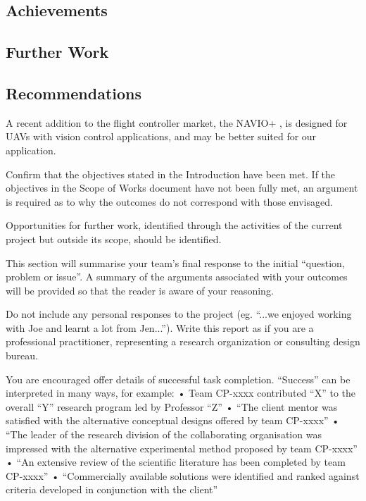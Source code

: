 \subsection{Achievements}


\subsection{Further Work}


\subsection{Recommendations}


 A recent addition to the flight controller market, the NAVIO+ \cite{ref:navio}, is designed for UAVs with vision control applications, and may be better suited for our application.

\color{red}
Confirm that the objectives stated in the Introduction have been met. If the objectives in the Scope of Works document have not been fully met, an argument is required as to why the outcomes do not correspond with those envisaged.

Opportunities for further work, identified through the activities of the current project but outside its scope, should be identified.

This section will summarise your team’s final response to the initial “question, problem or issue”.  A summary of the arguments associated with your outcomes will be provided so that the reader is aware of your reasoning.

Do not include any personal responses to the project (eg. “...we enjoyed working with Joe and learnt a lot from Jen...”).  Write this report as if you are a professional practitioner, representing a research organization or consulting design bureau.

You are encouraged offer details of successful task completion. “Success” can be interpreted in many ways, for example: 
•	Team CP-xxxx contributed “X” to the overall “Y” research program led by Professor “Z”
•	“The client mentor was satisfied with the alternative conceptual designs offered by team CP-xxxx”
•	“The leader of the research division of the collaborating organisation was impressed with the alternative experimental method proposed by team CP-xxxx”
•	“An extensive review of the scientific literature has been completed by team CP-xxxx”
•	“Commercially available solutions were identified and ranked against criteria developed in conjunction with the client”

